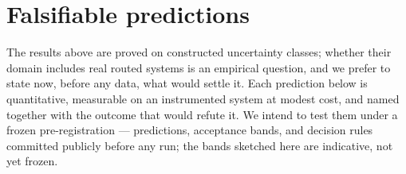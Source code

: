 %

\section{Falsifiable predictions}\label{sec:predictions}

The results above are proved on constructed uncertainty classes; whether
their domain includes real routed systems is an empirical question, and we
prefer to state now, before any data, what would settle it. Each prediction
below is quantitative, measurable on an instrumented system at modest cost,
and named together with the outcome that would refute it. We intend to test
them under a frozen pre-registration --- predictions, acceptance bands, and
decision rules committed publicly before any run; the bands sketched here
are indicative, not yet frozen.

